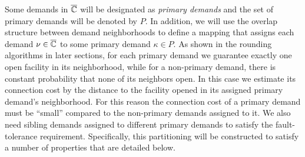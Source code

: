 \documentclass[11pt]{article}
\begin{document}
Some demands in $\overline{\mathbb{C}}$ will be designated as
\emph{primary demands} and the set of primary demands will
be denoted by $P$. In addition, we will use the overlap
structure between demand neighborhoods to define a mapping
that assigns each demand $\nu\in\overline{\mathbb{C}}$ to some primary
demand $\kappa\in P$. As shown in the rounding algorithms in
later sections, for each primary demand we guarantee exactly
one open facility in its neighborhood, while for a
non-primary demand, there is constant probability that none
of its neighbors open. In this case we estimate its
connection cost by the distance to the facility opened in
its assigned primary demand's neighborhood. For this reason
the connection cost of a primary demand must be ``small''
compared to the non-primary demands assigned to it. We also
need sibling demands assigned to different primary demands to satisfy
the fault-tolerance requirement. Specifically, this
partitioning will be constructed to satisfy a number of
properties that are detailed below.
%
\end{document}
